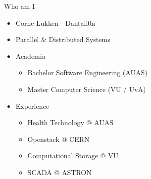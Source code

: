 \documentclass[aspectratio=169, notes]{beamer}
\begin{document}
\begin{frame}{Who am I}
    \begin{itemize}
        \item Corne Lukken - Dantali0n
        \item Parallel \& Distributed Systems
        \item Academia
        \begin{itemize}
            \item \footnotesize Bachelor Software Engineering (AUAS)
            \item \footnotesize Master Computer Science (VU / UvA)
        \end{itemize}
        \item Experience
        \begin{itemize}
            \item \footnotesize Health Technology @ AUAS
            \item \footnotesize Openstack @ CERN
            \item \footnotesize Computational Storage @ VU
            \item \footnotesize SCADA @ ASTRON
        \end{itemize}
    \end{itemize}
\end{frame}
\end{document}
